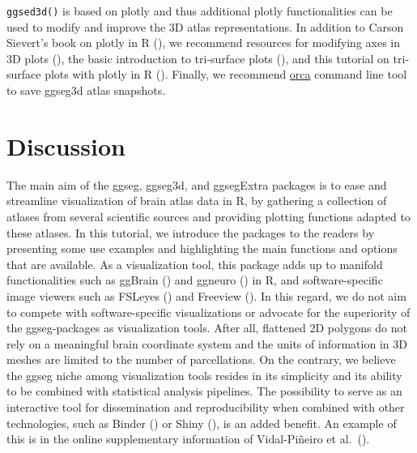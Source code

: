 \documentclass[fleqn,10pt]{wlpeerj} %
\begin{document}
\texttt{ggsed3d()} is based on plotly and thus additional plotly functionalities can be used to modify and improve the 3D atlas representations.
In addition to Carson Sievert's book on plotly in R (\citeyearpar{plotly}), we recommend resources for modifying axes in 3D plots (\citet{plotly-ax}), the basic introduction to tri-surface plots (\citet{plotly-tri}), and this tutorial on tri-surface plots with plotly in R (\citet{plotly-trisurf}).
Finally, we recommend \href{https://github.com/plotly/orca\#installation}{orca} command line tool to save ggseg3d atlas snapshots.

\hypertarget{discussion}{%
\section{Discussion}\label{discussion}}

The main aim of the ggseg, ggseg3d, and ggsegExtra packages is to ease and streamline visualization of brain atlas data in R, by gathering a collection of atlases from several scientific sources and providing plotting functions adapted to these atlases.
In this tutorial, we introduce the packages to the readers by presenting some use examples and highlighting the main functions and options that are available.
As a visualization tool, this package adds up to manifold functionalities such as ggBrain (\citet{ggBrain}) and ggneuro (\citet{ggneuro}) in R, and software-specific image viewers such as FSLeyes (\citet{fsleyes}) and Freeview (\citet{dale_99}).
In this regard, we do not aim to compete with software-specific visualizations or advocate for the superiority of the ggseg-packages as visualization tools.
After all, flattened 2D polygons do not rely on a meaningful brain coordinate system and the units of information in 3D meshes are limited to the number of parcellations.
On the contrary, we believe the ggseg niche among visualization tools resides in its simplicity and its ability to be combined with statistical analysis pipelines.
The possibility to serve as an interactive tool for dissemination and reproducibility when combined with other technologies, such as Binder (\citet{binder}) or Shiny (\citet{shiny}), is an added benefit.
An example of this is in the online supplementary information of Vidal-Piñeiro et al.~(\citeyearpar{vidal_2019}).
\end{document}
